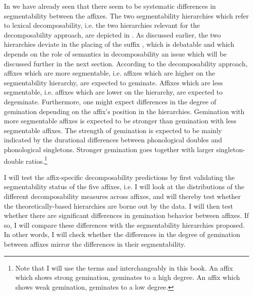{ In  we have already seen that there seem to be systematic differences in segmentability between the affixes. 
The two segmentability hierarchies which refer to lexical decomposability, i.e. the two hierarchies relevant for the decomposability approach, are depicted in . As discussed earlier, the two hierarchies deviate in the placing of the suffix , which is debatable and which depends on the role of semantics in decomposability \textendash  an issue which will be discussed further in the next section.
According to the decomposability approach, affixes which are more segmentable, i.e. affixes which are higher on the segmentability hierarchy, are expected to geminate. Affixes which are less segmentable, i.e. affixes which are lower on the hierarchy, are expected to degeminate. Furthermore, one might expect differences in the degree of gemination depending on the affix's position in the hierarchies. Gemination with more segmentable affixes is expected to be stronger than gemination with less segmentable affixes. The strength of gemination is expected to be mainly indicated by the durational differences between phonological doubles and phonological singletons. Stronger gemination goes together with larger singleton-double ratios.\footnote{Note that I will use the terms  and  interchangeably in this book. An affix which shows strong gemination, geminates to a high degree. An affix which shows weak gemination, geminates to a low degree.}




I will test the affix-specific decomposability predictions by first validating the segmentability status of the five affixes, i.e. I will look at the distributions of the different decomposability measures across affixes, and will thereby test whether the theoretically-based hierarchies are borne out by the data. I will then test whether there are significant differences in gemination behavior between affixes. If so, I will compare these differences with the segmentability hierarchies proposed. In other words, I will check whether  the differences in the degree of gemination between affixes mirror the differences in their segmentability.

}

